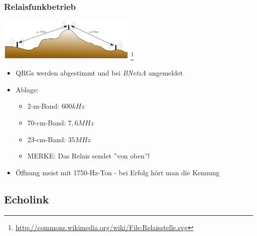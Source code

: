 \begin{frame}
    \frametitle{Relaisfunkbetrieb}

    \begin{center}
        \includegraphics[width=0.5\textwidth]{bv11/Relaisstelle.png}
        \footnote{\tiny \url{http://commons.wikimedia.org/wiki/File:Relaisstelle.svg}}
    \end{center}

    \begin{itemize}
        \item QRGs werden abgestimmt und bei \emph{BNetzA} angemeldet
        \item Ablage:
        \begin{itemize}
            \item 2-m-Band: $600 kHz$
            \item 70-cm-Band: $7,6 MHz$
            \item 23-cm-Band: $35 MHz$
            \item MERKE: Das Relais sendet ''von oben''!
        \end{itemize}
        \item Öffnung meist mit 1750-Hz-Ton - bei Erfolg hört man die Kennung
    \end{itemize}

\end{frame}


\subsection{Echolink}

